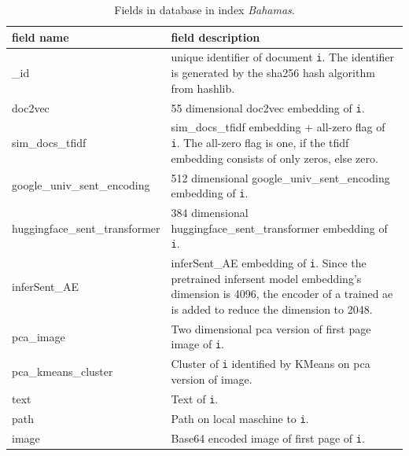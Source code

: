 \begin{table}[]
    \caption{Fields in \databaseName{} database in index \textit{Bahamas}.}
    \begin{tabular}{|
    >{\columncolor[HTML]{EFEFEF}}l |p{}|}
    \hline
    \cellcolor[HTML]{C0C0C0}\textbf{field name} & \cellcolor[HTML]{C0C0C0}\textbf{field description}                                     \\ \hline
    \_id                                        & unique identifier of document \texttt{i}. The identifier is generated by the sha256 hash algorithm from hashlib.\\ \hline
    doc2vec                                     & 55 dimensional doc2vec embedding of \texttt{i}.                                                          \\ \hline
    sim\_docs\_tfidf                            & sim\_docs\_tfidf embedding + all-zero flag of \texttt{i}. The all-zero flag is one, if the tfidf embedding consists of only zeros, else zero.\\ \hline
    google\_univ\_sent\_encoding                & 512 dimensional google\_univ\_sent\_encoding embedding of \texttt{i}.                                     \\ \hline
    huggingface\_sent\_transformer              & 384 dimensional huggingface\_sent\_transformer embedding of \texttt{i}.                                  \\ \hline
    inferSent\_AE                               & inferSent\_AE embedding of \texttt{i}. Since the pretrained infersent model embedding's dimension is 4096, the encoder of a trained \ac{ae} is added to reduce the dimension to 2048.                                                    \\ \hline
    pca\_image                                  & Two dimensional \ac{pca} version of first page image of \texttt{i}.                      \\ \hline
    pca\_kmeans\_cluster                        & Cluster of \texttt{i} identified by KMeans on \ac{pca} version of image.                 \\ \hline
    text                                        & Text of \texttt{i}.                                                                       \\ \hline
    path                                        & Path on local maschine to \texttt{i}.                                                     \\ \hline
    image                                       & Base64 encoded image of first page of \texttt{i}.                                                        \\ \hline
    \end{tabular}
    \label{tbl:Elasticsearch-fields}
\end{table}

